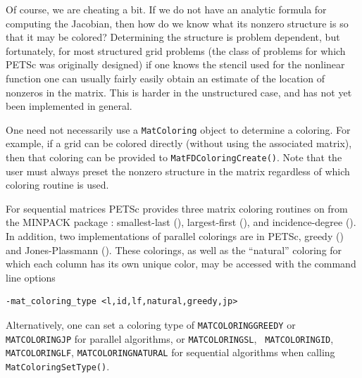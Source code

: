 Of course, we are cheating a bit. If we do not have an analytic
formula for computing the Jacobian, then how do we know what its
nonzero structure is so that it may be colored?  Determining the
structure is problem dependent, but fortunately, for most structured grid
problems (the class of problems for which PETSc was originally designed) if one
knows the stencil used for the nonlinear function one can usually
fairly easily obtain an estimate of the location of nonzeros in
the matrix. This is harder in the unstructured case, and has not yet
been implemented in general.

One need not necessarily use a \lstinline{MatColoring} object to
determine a coloring.  For example, if a grid can be colored directly
(without using the associated matrix), then that coloring can be provided
to \lstinline{MatFDColoringCreate()}.  Note that the user must always
preset the nonzero structure in the matrix regardless of which
coloring routine is used.

For sequential matrices PETSc provides three matrix coloring routines on from the MINPACK package \cite{more84}:
smallest-last (), largest-first (), and incidence-degree ().  In addition, two implementations
of parallel colorings are in PETSc, greedy () and Jones-Plassmann (). These colorings, as well as the
``natural'' coloring for which each column has its own unique color, may be accessed with the command line options
\begin{lstlisting}
-mat_coloring_type <l,id,lf,natural,greedy,jp>
\end{lstlisting}
Alternatively, one can set a coloring type of \lstinline{MATCOLORINGGREEDY} or \lstinline{MATCOLORINGJP} for parallel algorithms,
or \lstinline{MATCOLORINGSL}, \lstinline{ MATCOLORINGID}, \lstinline{MATCOLORINGLF}, \lstinline{MATCOLORINGNATURAL} for sequential algorithms
when calling \lstinline{MatColoringSetType()}.   
   

